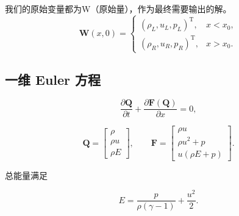 我们的原始变量都为W（原始量），作为最终需要输出的解。
\begin{equation}
\bm{W}(x,0)=
\begin{cases}
(\rho_L,u_L,p_L)^{\mathrm T}, & x<x_0,\\
(\rho_R,u_R,p_R)^{\mathrm T}, & x>x_0.
\end{cases}
\end{equation}

\subsection{一维 Euler 方程}

\begin{equation}
\frac{\partial \bm{Q}}{\partial t}
+
\frac{\partial \bm{F}(\bm{Q})}{\partial x}
=0,
\end{equation}

\begin{equation}
\bm{Q}=
\begin{bmatrix}
\rho\\
\rho u\\
\rho E
\end{bmatrix},
\qquad
\bm{F}=
\begin{bmatrix}
\rho u\\
\rho u^2+p\\
u(\rho E+p)
\end{bmatrix}.
\end{equation}

总能量满足

\begin{equation}
E=\frac{p}{\rho(\gamma-1)}+\frac{u^2}{2}.
\end{equation}


